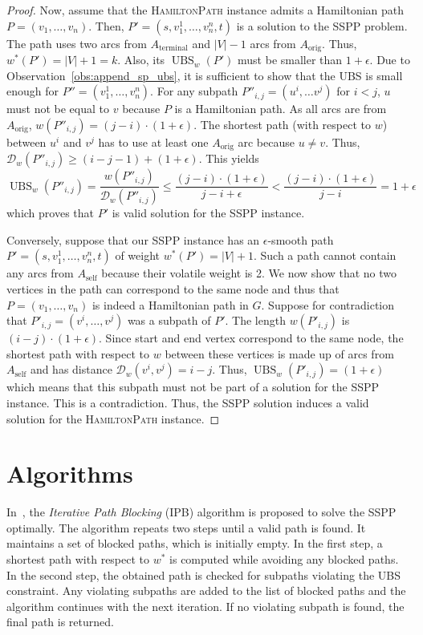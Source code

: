 \documentclass[a4paper,UKenglish,cleveref, autoref, thm-restate]{lipics-v2021}
\newcommand*{\dist}{\mathcal{D}}
\newcommand*{\ubs}{\operatorname{UBS}}
\begin{document}
\begin{proof}
Now, assume that the \textsc{HamiltonPath} instance admits a Hamiltonian path $P = (v_1, \dots, v_n)$.
Then, $P' = (s, v_1^1, \dots, v_n^n, t)$ is a solution to the SSPP problem.
The path uses two arcs from $A_{\operatorname{terminal}}$ and $|V|-1$ arcs from $A_{\operatorname{orig}}$.
Thus, $w^{*}(P') = |V| + 1 = k$.
Also, its $\ubs_w(P')$ must be smaller than $1+\epsilon$.
Due to Observation~\ref{obs:append_sp_ubs}, it is sufficient to show that the UBS is small enough for $P'' = (v_1^1, \dots, v_n^n)$.
For any subpath $P''_{i,j} = (u^i, \dots v^j)$ for $i < j$, $u$ must not be equal to $v$ because $P$ is a Hamiltonian path.
As all arcs are from $A_{\operatorname{orig}}$, $w(P''_{i,j}) = (j-i) \cdot (1+\epsilon)$.
The shortest path (with respect to $w$) between $u^i$ and $v^j$ has to use at least one $A_{\operatorname{orig}}$ arc because $u \neq v$.
Thus, $\dist_w(P''_{i,j}) \geq (i - j - 1) + (1 + \epsilon)$.
This yields
\[
\ubs_w(P''_{i,j}) = \frac{w(P''_{i,j})}{\dist_w(P''_{i,j})} \leq \frac{(j-i) \cdot (1+\epsilon)}{j-i+\epsilon} < \frac{(j-i) \cdot (1+\epsilon)}{j-i} = 1 + \epsilon
\]
which proves that $P'$ is valid solution for the SSPP instance.

Conversely, suppose that our SSPP instance has an $\epsilon$-smooth path $P' = (s, v_1^1, \dots, v_n^n, t)$ of weight $w^*(P') = |V|+1$.
Such a path cannot contain any arcs from $A_{\operatorname{self}}$ because their volatile weight is 2.
We now show that no two vertices in the path can correspond to the same node and thus that $P = (v_1, \dots, v_n)$ is indeed a Hamiltonian path in $G$.
Suppose for contradiction that $P'_{i,j} = (v^i, \dots, v^j)$ was a subpath of $P'$.
The length $w(P'_{i,j})$ is $(i-j) \cdot (1+\epsilon)$.
Since start and end vertex correspond to the same node, the shortest path with respect to $w$ between these vertices is made up of arcs from $A_{\operatorname{self}}$ and has distance $\dist_w(v^i, v^j) = i-j$.
Thus, $\ubs_w(P'_{i,j}) = (1+\epsilon)$ which means that this subpath must not be part of a solution for the SSPP instance.
This is a contradiction.
Thus, the SSPP solution induces a valid solution for the \textsc{HamiltonPath} instance.
\end{proof}

\section{Algorithms}\label{sec:algos}

In~\cite{dss-tarrn-18}, the \emph{Iterative Path Blocking} (IPB) algorithm is proposed to solve the SSPP optimally.
The algorithm repeats two steps until a valid path is found.
It maintains a set of blocked paths, which is initially empty.
In the first step, a shortest path with respect to $w^*$ is computed while avoiding any blocked paths.
In the second step, the obtained path is checked for subpaths violating the UBS constraint.
Any violating subpaths are added to the list of blocked paths and the algorithm continues with the next iteration.
If no violating subpath is found, the final path is returned.
\end{document}

